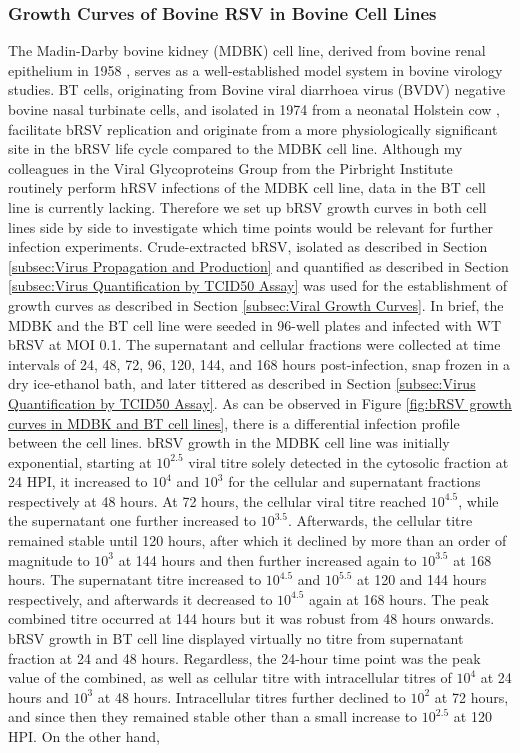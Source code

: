 \subsubsection{Growth Curves of Bovine RSV in Bovine Cell Lines} \label{Growth Curves of Bovine RSV in Bovine Cell Lines}
The Madin-Darby bovine kidney (MDBK) cell line, derived from bovine renal epithelium in 1958 \cite{Madin1958EstablishedOrigin.}, serves as a well-established model system in bovine virology studies. BT cells, originating from Bovine viral diarrhoea virus (BVDV) negative bovine nasal turbinate cells, and isolated in 1974 from a neonatal Holstein cow \cite{McClurkin1974ComparisonVirus.}, facilitate bRSV replication and originate from a more physiologically significant site in the bRSV life cycle compared to the MDBK cell line. Although my colleagues in the Viral Glycoproteins Group from the Pirbright Institute routinely perform hRSV infections of the MDBK cell line, data in the BT cell line is currently lacking. Therefore we set up bRSV growth curves in both cell lines side by side to investigate which time points would be relevant for further infection experiments. Crude-extracted bRSV, isolated as described in Section \ref{subsec:Virus Propagation and Production} and quantified as described in Section \ref{subsec:Virus Quantification by TCID50 Assay} was used for the establishment of growth curves as described in Section \ref{subsec:Viral Growth Curves}. In brief, the MDBK and the BT cell line were seeded in 96-well plates and infected with WT bRSV at MOI 0.1. The supernatant and cellular fractions were collected at time intervals of 24, 48, 72, 96, 120, 144, and 168 hours post-infection, snap frozen in a dry ice-ethanol bath, and later tittered as described in Section \ref{subsec:Virus Quantification by TCID50 Assay}. As can be observed in Figure \ref{fig:bRSV growth curves in MDBK and BT cell lines}, there is a differential infection profile between the cell lines. bRSV growth in the MDBK cell line was initially exponential, starting at \(10^{2.5}\) viral titre solely detected in the cytosolic fraction at 24 HPI, it increased to \(10^{4}\) and \(10^{3}\) for the cellular and supernatant fractions respectively at 48 hours. At 72 hours, the cellular viral titre reached \(10^{4.5}\), while the supernatant one further increased to \(10^{3.5}\). Afterwards, the cellular titre remained stable until 120 hours, after which it declined by more than an order of magnitude to \(10^{3}\) at 144 hours and then further increased again to \(10^{3.5}\) at 168 hours. The supernatant titre increased to \(10^{4.5}\) and \(10^{5.5}\) at 120 and 144 hours respectively, and afterwards it decreased to \(10^{4.5}\) again at 168 hours. The peak combined titre occurred at 144 hours but it was robust from 48 hours onwards. bRSV growth in BT cell line displayed virtually no titre from supernatant fraction at 24 and 48 hours. Regardless, the 24-hour time point was the peak value of the combined, as well as cellular titre with intracellular titres of \(10^{4}\) at 24 hours and \(10^{3}\) at 48 hours. Intracellular titres further declined to \(10^{2}\) at 72 hours, and since then they remained stable other than a small increase to \(10^{2.5}\) at 120 HPI. On the other hand, 
